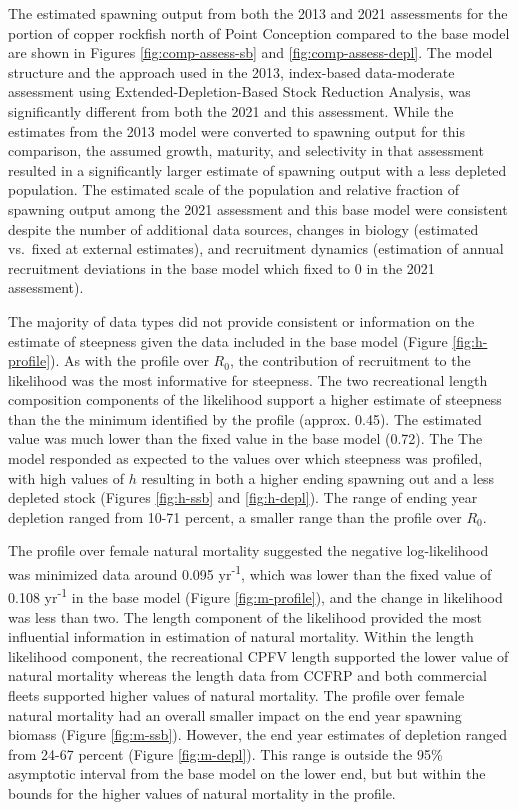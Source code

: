 \documentclass[11pt,
  english,
  letterpaper,
]{article}
\begin{document}
The estimated spawning output from both the 2013 and 2021 assessments for the portion of copper rockfish north of Point Conception compared to the base model are shown in Figures \ref{fig:comp-assess-sb} and \ref{fig:comp-assess-depl}. The model structure and the approach used in the 2013, index-based data-moderate assessment using Extended-Depletion-Based Stock Reduction Analysis, was significantly different from both the 2021 and this assessment. While the estimates from the 2013 model were converted to spawning output for this comparison, the assumed growth, maturity, and selectivity in that assessment resulted in a significantly larger estimate of spawning output with a less depleted population. The estimated scale of the population and relative fraction of spawning output among the 2021 assessment and this base model were consistent despite the number of additional data sources, changes in biology (estimated vs.~fixed at external estimates), and recruitment dynamics (estimation of annual recruitment deviations in the base model which fixed to 0 in the 2021 assessment).

The majority of data types did not provide consistent or information on the estimate of steepness given the data included in the base model (Figure \ref{fig:h-profile}). As with the profile over \(R_0\), the contribution of recruitment to the likelihood was the most informative for steepness. The two recreational length composition components of the likelihood support a higher estimate of steepness than the the minimum identified by the profile (approx. 0.45). The estimated value was much lower than the fixed value in the base model (0.72). The The model responded as expected to the values over which steepness was profiled, with high values of \(h\) resulting in both a higher ending spawning out and a less depleted stock (Figures \ref{fig:h-ssb} and \ref{fig:h-depl}). The range of ending year depletion ranged from 10-71 percent, a smaller range than the profile over \(R_0\).

The profile over female natural mortality suggested the negative log-likelihood was minimized data around 0.095 yr\textsuperscript{-1}, which was lower than the fixed value of 0.108 yr\textsuperscript{-1} in the base model (Figure \ref{fig:m-profile}), and the change in likelihood was less than two. The length component of the likelihood provided the most influential information in estimation of natural mortality. Within the length likelihood component, the recreational CPFV length supported the lower value of natural mortality whereas the length data from CCFRP and both commercial fleets supported higher values of natural mortality. The profile over female natural mortality had an overall smaller impact on the end year spawning biomass (Figure \ref{fig:m-ssb}). However, the end year estimates of depletion ranged from 24-67 percent (Figure \ref{fig:m-depl}). This range is outside the 95\% asymptotic interval from the base model on the lower end, but but within the bounds for the higher values of natural mortality in the profile.
\end{document}
